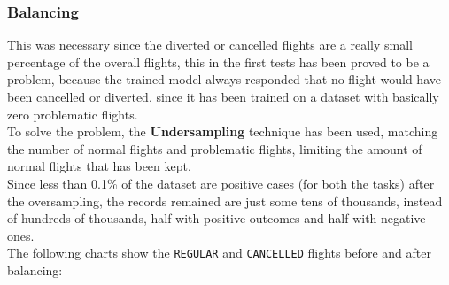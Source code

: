 \documentclass[
	letterpaper, %
	10pt, %
]{class}
\begin{document}
\subsubsection{Balancing}

This was necessary since the diverted or cancelled flights are a really small percentage of the overall flights,
this in the first tests has been proved to be a problem, because the trained model always responded that no flight would have been cancelled or diverted, since it has been trained on a dataset with basically zero problematic flights.\\

To solve the problem, the \textbf{Undersampling} technique has been used, matching the number of normal flights and problematic flights, limiting the amount of normal flights that has been kept.\\

Since less than 0.1\% of the dataset are positive cases (for both the tasks) after the oversampling, the records remained are just some tens of thousands, instead of hundreds of thousands, half with positive outcomes and half with negative ones.\\

The following charts show the \texttt{REGULAR} and \texttt{CANCELLED} flights before and after balancing:\\
\end{document}
